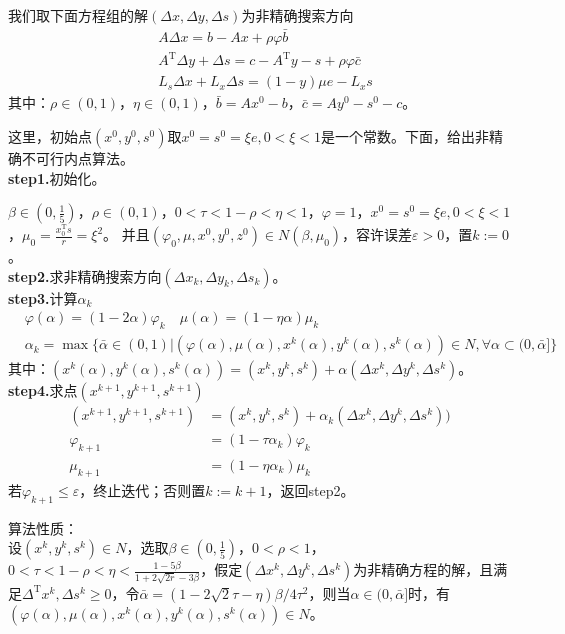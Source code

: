         \par
        我们取下面方程组的解$(\Delta x,\Delta y,\Delta s)$为非精确搜索方向
        \begin{align*}
        & A \Delta x=b-Ax+\rho\varphi\bar{b}\\
        & A^\mathrm{T} \Delta y+\Delta s=c-A^\mathrm{T} y-s+\rho\varphi\bar{c}\\
        & L_s\Delta x+L_x\Delta s=(1-y)\mu e-L_xs
        \end{align*}
        其中：$\rho\in (0,1)$，$\eta \in (0,1)$，$\bar{b}=Ax^0-b$，$\bar{c}=Ay^0-s^0-c$。
        \par
        这里，初始点$(x^0,y^0,s^0)$取$x^0=s^0=\xi e,0<\xi <1$是一个常数。下面，给出非精确不可行内点算法。\\
        \textbf{step1.}初始化。\par
        $\beta \in (0,\frac 15)$，$\rho \in (0,1)$，$0<\tau<1-\rho<\eta<1$，$\varphi=1$，$x^0=s^0=\xi e,0<\xi<1$，${\mu}_0=\frac{x_0^\mathrm{T} s}{r}={\xi}^2$。
        并且$({\varphi}_0,\mu,x^0,y^0,z^0)\in N(\beta,{\mu}_0)$，容许误差$\varepsilon>0$，置$k:=0$。\\
        \textbf{step2.}求非精确搜索方向$(\Delta x_k,\Delta y_k,\Delta s_k)$。\\
        \textbf{step3.}计算${\alpha}_k$
        \begin{align*}
        &\varphi({\alpha})=(1-2\alpha ){\varphi}_k \quad \mu({\alpha})=(1-{\eta}\alpha ){\mu}_k\\
        &{\alpha}_k={\max}\{\bar{\alpha}\in(0,1)|(\varphi(\alpha),\mu(\alpha),x^k(\alpha),y^k(\alpha),s^k(\alpha))\in N,\forall \alpha \subset (0,\bar{\alpha}]\}
        \end{align*}
        其中：$(x^k({\alpha}),y^k({\alpha}),s^k({\alpha}))=(x^k,y^k,s^k)+\alpha (\Delta x^k,\Delta y^k,\Delta s^k)$。\\
        \textbf{step4.}求点$(x^{k+1},y^{k+1},s^{k+1})$
        \begin{align*}
        (x^{k+1},y^{k+1},s^{k+1})&=(x^k,y^k,s^k)+{\alpha}_k (\Delta x^k,\Delta y^k,\Delta s^k))\\
        {\varphi}_{k+1}&=(1-\tau {\alpha}_k){\varphi}_{k}\\
        {\mu}_{k+1}&=(1-\eta {\alpha}_k){\mu}_{k}
        \end{align*}
        若${\varphi}_{k+1} \leqslant \varepsilon$，终止迭代；否则置$k:=k+1$，返回step2。
        \par
        算法性质：\\
        设$(x^k,y^k,s^k)\in N$，选取$\beta \in (0,\frac 15)$，$0<\rho <1$，$0<\tau<1-\rho<\eta<\frac{1-5\beta}{1+2\sqrt{2r}-3\beta}$，假定$(\Delta x^k,\Delta y^k,\Delta s^k)$为非精确方程的解，且满足${\Delta}^\mathrm{T}{x^k} ,{\Delta}{s^k} \geqslant 0$，令$\bar{\alpha}=(1-2\sqrt{2}\tau-\eta)\beta /4{\tau}^2$，则当$\alpha \in (0,\bar{\alpha}]$时，有$(\varphi(\alpha),\mu(\alpha),x^k(\alpha),y^k(\alpha),s^k(\alpha))\in N$。\\
